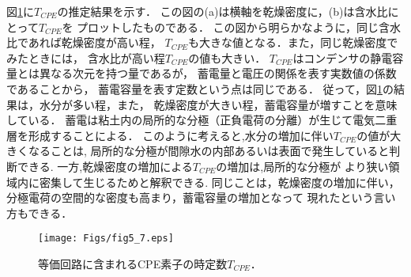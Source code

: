 図\ref{fig:fig5_7}に$T_{CPE}$の推定結果を示す．
この図の(a)は横軸を乾燥密度に，(b)は含水比にとって$T_{CPE}$を
プロットしたものである．
この図から明らかなように，同じ含水比であれば乾燥密度が高い程，
$T_{CPE}$も大きな値となる．また，同じ乾燥密度でみたときには，
含水比が高い程$T_{CPE}$の値も大きい．
$T_{CPE}$はコンデンサの静電容量とは異なる次元を持つ量であるが，
蓄電量と電圧の関係を表す実数値の係数であることから，
蓄電容量を表す定数という点は同じである．
従って，図\ref{fig:fig5_7}の結果は，水分が多い程，また，
乾燥密度が大きい程，蓄電容量が増すことを意味している．
蓄電は粘土内の局所的な分極（正負電荷の分離）が生じて電気二重層を形成することによる．
このように考えると,水分の増加に伴い$T_{CPE}$の値が大きくなることは,
局所的な分極が間隙水の内部あるいは表面で発生していると判断できる.
一方,乾燥密度の増加による$T_{CPE}$の増加は,局所的な分極が
より狭い領域内に密集して生じるためと解釈できる.
同じことは，乾燥密度の増加に伴い，分極電荷の空間的な密度も高まり，蓄電容量の増加となって
現れたという言い方もできる．\\
\begin{figure}[h]
	\begin{center}
	\texttt{[image: Figs/fig5\_7.eps]} 
	\end{center}
	\caption{
		等価回路に含まれるCPE素子の時定数$T_{CPE}$．
	} 
	\label{fig:fig5_7}
\end{figure}

